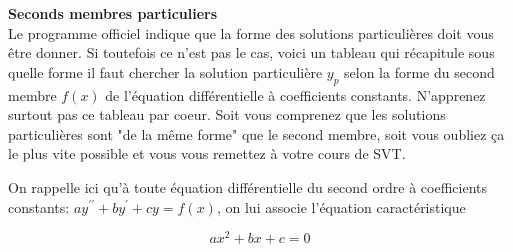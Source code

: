 \documentclass[a4paper, 11pt]{article}
\begin{document}
\textbf{\large{Seconds membres particuliers}}\\
Le programme officiel indique que la forme des solutions particulières doit vous être donner. Si toutefois ce n'est pas le cas, voici un tableau qui r\'ecapitule sous quelle forme il faut chercher la solution particuli\`ere $y_p$ selon la forme du second membre $f(x)$ de l'\'equation diff\'erentielle \`a coefficients constants. N'apprenez surtout pas ce tableau par coeur. Soit vous comprenez que les solutions particulières sont "de la même forme" que le second membre, soit vous oubliez ça le plus vite possible et vous vous remettez à votre cours de SVT.


On rappelle ici qu'\`a toute \'equation diff\'erentielle du second ordre \`a coefficients constants: $ay^{\prime\prime}+by^{\prime}+cy=f(x)$, on lui associe l'\'equation caract\'eristique

\begin{equation}\label{eq caractéristique}\tag{EC}
  ax^2+bx+c=0
\end{equation}
\end{document}
